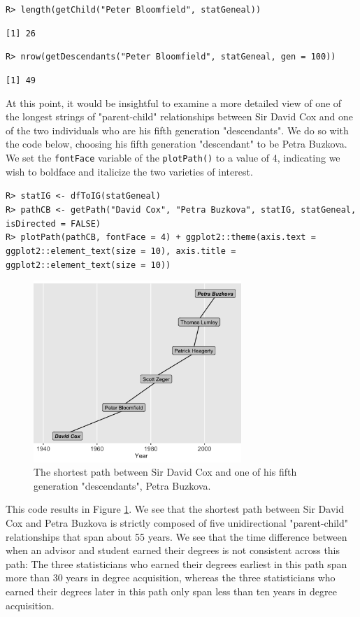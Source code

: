 \documentclass[11pt,a4paper,oldfontcommands,openany]{memoir}
\DeclareRobustCommand{\mybox}[2][gray!15]{%
\begin{tcolorbox}[   %
        breakable,
        left=0pt,
        right=0pt,
        top=0pt,
        bottom=0pt,
        colback=#1,
        colframe=#1,
        width=\dimexpr\textwidth\relax, 
        enlarge left by=0mm,
        boxsep=5pt,
        arc=0pt,outer arc=0pt,
        ]
        #2
\end{tcolorbox}
}
\numberwithin{equation}{section} %
\newcommand{\code}[1]{{\texttt{#1}}}
\begin{document}
\mybox{
\texttt{R> length(getChild("Peter Bloomfield", statGeneal))}
}

\mybox[green!10]{
\texttt{[1] 26}
}

\mybox{
\texttt{R> nrow(getDescendants("Peter Bloomfield", statGeneal, gen = 100))}
}

\mybox[green!10]{
\texttt{[1] 49}
}

At this point, it would be insightful to examine a more detailed view of one of the longest strings of "parent-child" relationships between Sir David Cox and one of the two individuals who are his fifth generation "descendants". We do so with the code below, choosing his fifth generation "descendant" to be Petra Buzkova. We set the \code{fontFace} variable of the \code{plotPath()} to a value of 4, indicating we wish to boldface and italicize the two varieties of interest.

\mybox{
\texttt{R> statIG <- dfToIG(statGeneal)}\\
\texttt{R> pathCB <- getPath("David Cox", "Petra Buzkova", statIG, statGeneal, isDirected = FALSE)}\\
\texttt{R> plotPath(pathCB, fontFace = 4) + ggplot2::theme(axis.text = ggplot2::element\_text(size = 10), axis.title = ggplot2::element\_text(size = 10))}
}

\begin{figure}[H]
    \centering
    \includegraphics[width=0.7\textwidth]{pathCB}
    \caption{The shortest path between Sir David Cox and one of his fifth generation "descendants", Petra Buzkova.}
    \label{fig:pathCB}
\end{figure}

This code results in Figure \ref{fig:pathCB}. We see that the shortest path between Sir David Cox and Petra Buzkova is strictly composed of five unidirectional "parent-child" relationships that span about 55 years. We see that the time difference between when an advisor and student earned their degrees is not consistent across this path: The three statisticians who earned their degrees earliest in this path span more than 30 years in degree acquisition, whereas the three statisticians who earned their degrees later in this path only span less than ten years in degree acquisition.
\end{document}
